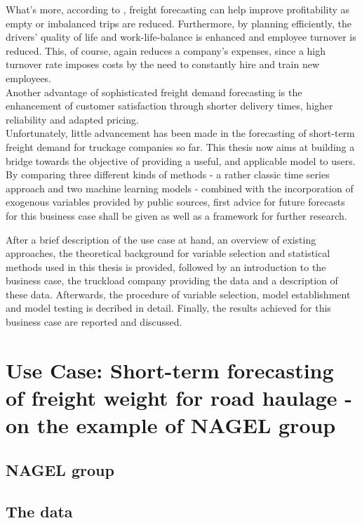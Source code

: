 \documentclass[a4paper, 11pt]{article}
\begin{document}
What's more, according to \cite{Fite.2002}, freight forecasting can help improve profitability as empty or imbalanced trips are reduced. Furthermore, by planning efficiently, the drivers' quality of life and work-life-balance is enhanced and employee turnover is reduced. This, of course, again reduces a company's expenses, since a high turnover rate imposes costs by the need to constantly hire and train new employees.\\
Another advantage of sophisticated freight demand forecasting is the enhancement of customer satisfaction through shorter delivery times, higher reliability and adapted pricing.\\

Unfortunately, little advancement has been made in the forecasting of short-term freight demand for truckage companies so far. This thesis now aims at building a bridge towards the objective of providing a useful,  and applicable model to users.\\
By comparing three different kinds of methods - a rather classic time series approach and two machine learning models - combined with the incorporation of exogenous variables provided by public sources, first advice for future forecasts for this business case shall be given as well as a framework for further research.

After a brief description of the use case at hand, an overview of existing approaches, the theoretical background for variable selection and statistical methods used in this thesis is provided, followed by an introduction to the business case, the truckload company providing the data and a description of these data. Afterwards, the procedure of variable selection, model establishment and model testing is decribed in detail. Finally, the results achieved for this business case are reported and discussed. 

\section{Use Case: Short-term forecasting of freight weight for road haulage - on the example of NAGEL group}
\subsection{NAGEL group}
\subsection{The data}
\end{document}
